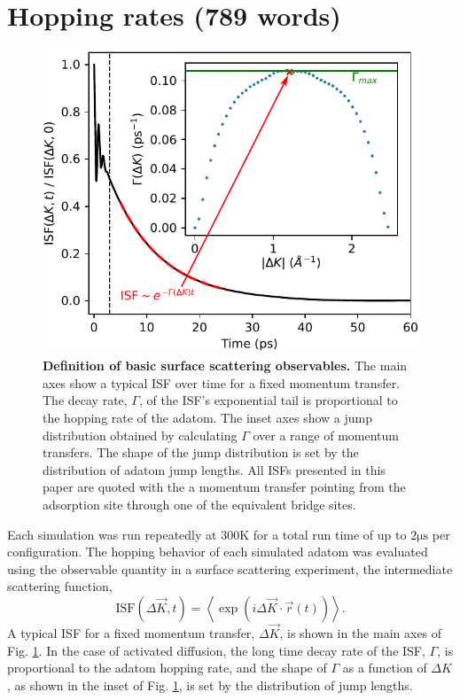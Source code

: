\documentclass[7pt]{article}
\newcommand{\us}{\si{\micro\second}}
\newcommand{\K}{\si{\kelvin}}
\begin{document}
\section*{Hopping rates (789 words)}

\begin{figure}
	\centering
	\includegraphics[width=1.0\columnwidth]{isf_dk}
	\caption{\textbf{Definition of basic surface scattering observables.} The main axes show a typical ISF over time for a fixed momentum transfer. The decay rate, $\Gamma$, of the ISF's exponential tail is proportional to the hopping rate of the adatom. The inset axes show a jump distribution obtained by calculating $\Gamma$ over a range of momentum transfers. The shape of the jump distribution is set by the distribution of adatom jump lengths. All ISFs presented in this paper are quoted with the a momentum transfer pointing from the adsorption site through one of the equivalent bridge sites.} 
	\label{fig:isf_dk}
\end{figure}

Each simulation was run repeatedly at $300\K$ for a total run time of up to $2\us$ per configuration. The hopping behavior of each simulated adatom was evaluated using the observable quantity in a surface scattering experiment, the intermediate scattering function,
\begin{equation}
	\mathrm{ISF}(\Delta{\vec{K}}, t) = \left<\exp\left(i\Delta{\vec{K}}\cdot\vec{r}(t)\right)\right>.
\end{equation}
A typical ISF for a fixed momentum transfer, $\Delta{\vec{K}}$, is shown in the main axes of Fig. \ref{fig:isf_dk}. In the case of activated diffusion, the long time decay rate of the ISF, $\Gamma$, is proportional to the adatom hopping rate, and the shape of $\Gamma$ as a function of $\Delta{K}$, as shown in the inset of Fig. \ref{fig:isf_dk}, is set by the distribution of jump lengths\cite{Chudley, Diamant}.
\end{document}
